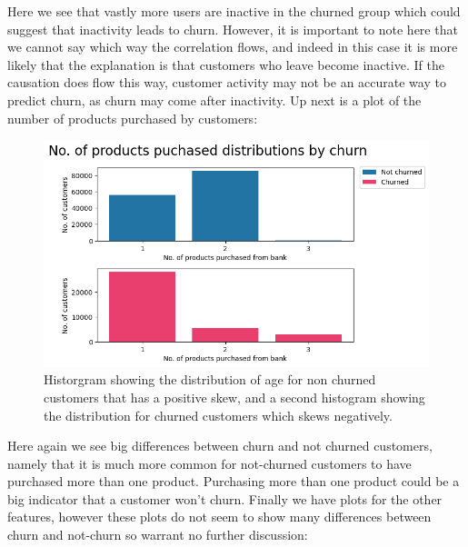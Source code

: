 \documentclass[]{article}
\begin{document}
Here we see that vastly more users are inactive in the churned group which could suggest that inactivity leads to churn. However, it is important to note here that we cannot say which way the correlation flows, and indeed in this case it is more likely that the explanation is that customers who leave become inactive. If the causation does flow this way, customer activity may not be an accurate way to predict churn, as churn may come after inactivity. Up next is a plot of the number of products purchased by customers:

\begin{figure}[h!]
	\centering
	\includegraphics[scale=0.5]{products_by_churn}
	\caption{Historgram showing the distribution of age for non churned customers that has a positive skew, and a second histogram showing the distribution for churned customers which skews negatively. }
\end{figure}

Here again we see big differences between churn and not churned customers, namely that it is much more common for not-churned customers to have purchased more than one product. Purchasing more than one product could be a big indicator that a customer won’t churn. Finally we have plots for the other features, however these plots do not seem to show many differences between churn and not-churn so warrant no further discussion:
\clearpage
\end{document}
